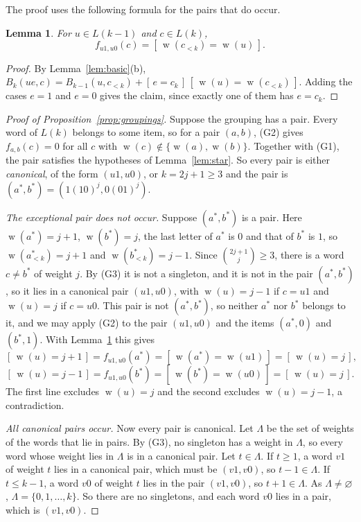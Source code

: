 \documentclass[11pt]{amsart}
\newtheorem{lemma}[theorem]{Lemma}
\theoremstyle{definition}
\theoremstyle{remark}
\numberwithin{equation}{section}
\newcommand{\Iv}[1]{[\,#1\,]}
\DeclareMathOperator{\wt}{w}
\begin{document}
The proof uses the following formula for the pairs that do occur.

\begin{lemma}\label{lem:canonical}
For $u\in L(k-1)$ and $c\in L(k)$,
\[
f_{u1,u0}(c)=\Iv{\wt(c_{<k})=\wt(u)} .
\]
\end{lemma}

\begin{proof}
By Lemma~\ref{lem:basic}(b), $B_k(ue,c)=B_{k-1}(u,c_{<k})+\Iv{e=c_k}\,\Iv{\wt(u)=\wt(c_{<k})}$. Adding the cases $e=1$ and $e=0$ gives the claim, since exactly one of them has $e=c_k$.
\end{proof}

\begin{proof}[Proof of Proposition~\ref{prop:groupings}]
Suppose the grouping has a pair. Every word of $L(k)$ belongs to some item, so for a pair $(a,b)$, (G2) gives $f_{a,b}(c)=0$ for all $c$ with $\wt(c)\notin\{\wt(a),\wt(b)\}$. Together with (G1), the pair satisfies the hypotheses of Lemma~\ref{lem:star}. So every pair is either \emph{canonical}, of the form $(u1,u0)$, or $k=2j+1\ge3$ and the pair is $(a^*,b^*)=(1(10)^j,0(01)^j)$.

\emph{The exceptional pair does not occur.} Suppose $(a^*,b^*)$ is a pair. Here $\wt(a^*)=j+1$, $\wt(b^*)=j$, the last letter of $a^*$ is $0$ and that of $b^*$ is $1$, so $\wt(a^*_{<k})=j+1$ and $\wt(b^*_{<k})=j-1$. Since $\binom{2j+1}{j}\ge3$, there is a word $c\ne b^*$ of weight $j$. By (G3) it is not a singleton, and it is not in the pair $(a^*,b^*)$, so it lies in a canonical pair $(u1,u0)$, with $\wt(u)=j-1$ if $c=u1$ and $\wt(u)=j$ if $c=u0$. This pair is not $(a^*,b^*)$, so neither $a^*$ nor $b^*$ belongs to it, and we may apply (G2) to the pair $(u1,u0)$ and the items $(a^*,0)$ and $(b^*,1)$. With Lemma~\ref{lem:canonical} this gives
\[
\Iv{\wt(u)=j+1}=f_{u1,u0}(a^*)=\Iv{\wt(a^*)=\wt(u1)}=\Iv{\wt(u)=j},
\]
\[
\Iv{\wt(u)=j-1}=f_{u1,u0}(b^*)=\Iv{\wt(b^*)=\wt(u0)}=\Iv{\wt(u)=j}.
\]
The first line excludes $\wt(u)=j$ and the second excludes $\wt(u)=j-1$, a contradiction.

\emph{All canonical pairs occur.} Now every pair is canonical. Let $\Lambda$ be the set of weights of the words that lie in pairs. By (G3), no singleton has a weight in $\Lambda$, so every word whose weight lies in $\Lambda$ is in a canonical pair. Let $t\in\Lambda$. If $t\ge1$, a word $v1$ of weight $t$ lies in a canonical pair, which must be $(v1,v0)$, so $t-1\in\Lambda$. If $t\le k-1$, a word $v0$ of weight $t$ lies in the pair $(v1,v0)$, so $t+1\in\Lambda$. As $\Lambda\ne\varnothing$, $\Lambda=\{0,1,\dots,k\}$. So there are no singletons, and each word $v0$ lies in a pair, which is $(v1,v0)$.
\end{proof}
\end{document}
